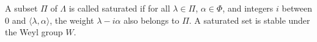 A subset $\Pi$ of $\Lambda$ is called saturated if for all $\lambda \in \Pi$, $\alpha \in \Phi$, and integers $i$ between $0$ and $\langle \lambda, \alpha \rangle$, the weight $\lambda - i\alpha$ also belongs to $\Pi$. A saturated set is stable under the Weyl group $W$.
